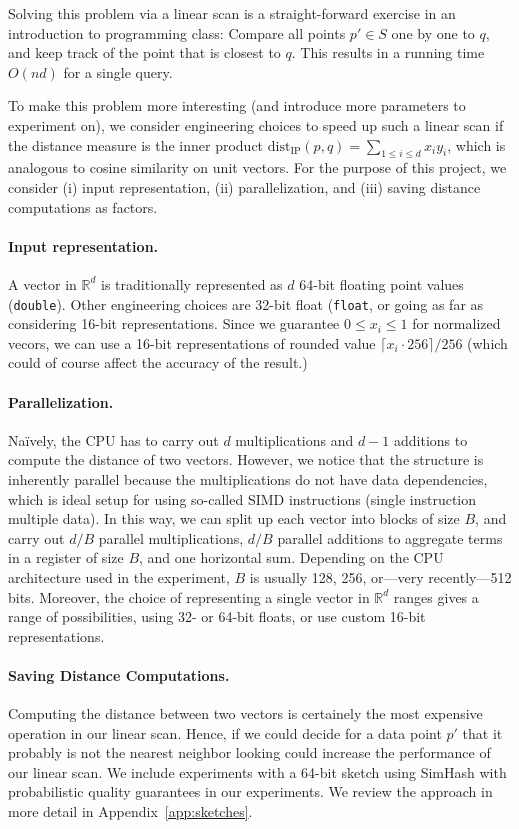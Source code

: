 \documentclass{llncs}
\begin{document}
Solving this problem via a linear scan is a straight-forward exercise in an introduction to programming class: Compare all points $p' \in S$ one by one to $q$, and keep track of the point that is closest to $q$. This results in a running time $O(nd)$ for a single query.

To make this problem more interesting (and introduce more parameters to experiment on), we consider engineering choices to speed up such a linear scan if the distance measure is the inner product $\text{dist}_{\text{IP}}(p,q) = \sum_{1 \leq i \leq d} x_i y_i$, which is analogous to cosine similarity on unit vectors. For the purpose of this project, we consider (i) input representation, (ii) parallelization, and (iii) saving distance computations as factors.

\paragraph{Input representation.}
A vector in $\mathbb{R}^d$ is traditionally represented as $d$ 64-bit floating point values (\texttt{double}). Other engineering choices are 32-bit float (\texttt{float}, or going as far as considering 16-bit representations. Since we guarantee $0 \leq x_i \leq 1$ for normalized vecors, we can use a 16-bit representations of rounded value $\lceil x_i \cdot 256 \rceil / 256$ (which could of course affect the accuracy of the result.)

\paragraph{Parallelization.}
Naïvely, the CPU has to carry out $d$ multiplications and $d-1$ additions to compute the distance of two vectors.
However, we notice that the structure is inherently parallel because the multiplications do not have data dependencies, which is ideal setup for using so-called SIMD instructions (single instruction multiple data). 
In this way, we can split up each vector into blocks of size $B$, and carry out $d/B$ parallel multiplications, $d/B$ parallel additions to aggregate terms in a register of size $B$, and one horizontal sum. 
Depending on the CPU architecture used in the experiment, $B$ is usually 128, 256, or---very recently---512 bits. Moreover, the choice of representing a single vector in $\mathbb{R}^d$ ranges gives a range of possibilities, using 32- or 64-bit floats, or use custom 16-bit representations.

\paragraph{Saving Distance Computations.} Computing the distance 
between two vectors is certainely the most expensive operation in our linear scan. Hence, if we could decide for a data point $p'$ that it probably is not the nearest neighbor looking could increase the performance of our linear scan. We include experiments with a 64-bit sketch using SimHash with probabilistic quality guarantees in our experiments. We review the approach in more detail in Appendix~\ref{app:sketches}.
\end{document}
